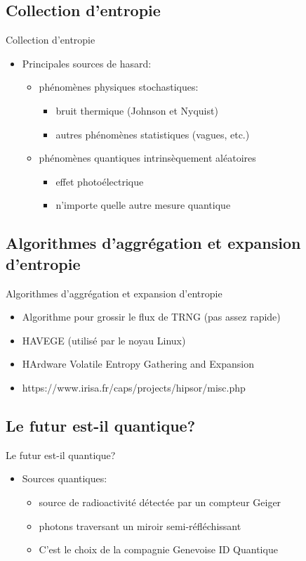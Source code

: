 \documentclass{beamer}
\begin{document}
\subsection{Collection d'entropie}
\begin{frame}{Collection d'entropie}
  \begin{itemize}
  \item Principales sources de hasard:
    \begin{itemize}
    \item phénomènes physiques stochastiques:
      \begin{itemize}
      \item bruit thermique (Johnson et Nyquist)
      \item autres phénomènes statistiques (vagues, etc.)
      \end{itemize}
    \item phénomènes quantiques intrinsèquement aléatoires
      \begin{itemize}
      \item effet photoélectrique
      \item n’importe quelle autre mesure quantique
      \end{itemize}
    \end{itemize}
  \end{itemize}
\end{frame}

\subsection{Algorithmes d'aggrégation et expansion d'entropie}
\begin{frame}{Algorithmes d'aggrégation et expansion d'entropie}
 \begin{itemize}
 \item Algorithme pour grossir le flux de TRNG (pas assez rapide)
 \item HAVEGE (utilisé par le noyau Linux)
 \item HArdware Volatile Entropy Gathering and Expansion
 \item https://www.irisa.fr/caps/projects/hipsor/misc.php
 \end{itemize}
\end{frame}

\subsection{Le futur est-il quantique?}
\begin{frame}{Le futur est-il quantique?}
 \begin{itemize}
 \item Sources quantiques:
   \begin{itemize}
   \item source de radioactivité détectée par un compteur Geiger
   \item photons traversant un miroir semi-réfléchissant
   \item C’est le choix de la compagnie Genevoise ID Quantique
   \end{itemize}
 \end{itemize}
\end{frame}
\end{document}
